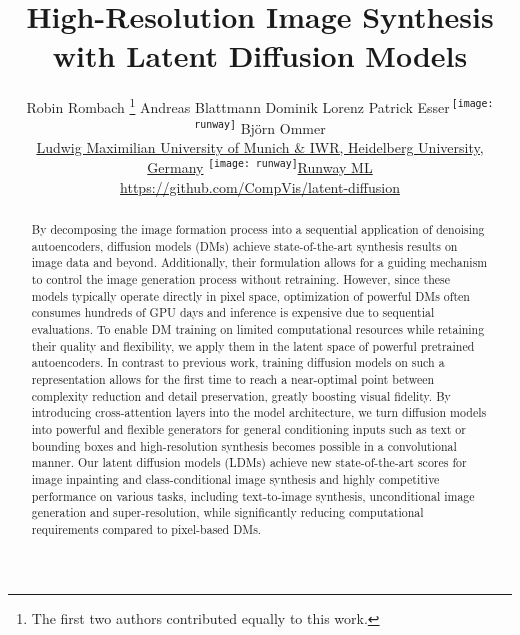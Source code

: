 \documentclass[10pt,twocolumn,letterpaper]{article}
\newcommand{\projectpath}{https://github.com/CompVis/latent-diffusion}
\begin{document}
\title{\vspace{-2.5em} High-Resolution Image Synthesis with Latent Diffusion Models}  




\author{Robin Rombach \thanks{The first two authors contributed equally to this
  work.} \qquad Andreas Blattmann \qquad Dominik Lorenz \qquad
  Patrick Esser\textsuperscript{\,\texttt{[image: runway]}} \qquad Bj\"orn Ommer \\
\small{\href{https://ommer-lab.com/}{Ludwig Maximilian University of Munich \& IWR, Heidelberg
  University, Germany} \qquad \textsuperscript{\texttt{[image: runway]}}\href{https://runwayml.com/}{Runway ML}}\\
\url{\projectpath} 
}
\maketitle


\begin{abstract}




By decomposing the image formation process into a sequential application of denoising autoencoders, diffusion models (DMs) achieve state-of-the-art synthesis results on image data and beyond.
Additionally, their formulation allows for a guiding mechanism to control the image generation process without retraining.
However, since these models typically operate directly in pixel space, optimization of powerful DMs often consumes hundreds of GPU days and inference is expensive due to 
sequential evaluations.
To enable DM training on limited computational resources while retaining their quality and flexibility, 
we apply them in the latent space of powerful pretrained autoencoders.
In contrast to previous work, training diffusion models on such a representation allows for the first time to reach a near-optimal point 
between complexity reduction and detail preservation,
greatly boosting visual fidelity.
By introducing cross-attention layers into the model architecture, 
we turn diffusion models into powerful and flexible 
generators for general conditioning inputs such as text or bounding boxes and high-resolution synthesis becomes possible in a convolutional manner.
Our latent diffusion models (LDMs) achieve new state-of-the-art scores for image
inpainting and class-conditional image synthesis and highly competitive performance on various tasks, including
text-to-image synthesis, unconditional image generation and super-resolution, while 
significantly reducing computational requirements compared to pixel-based DMs.


\end{abstract}
\end{document}
